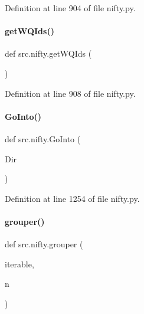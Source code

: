 Definition at line 904 of file nifty.\+py.

\mbox{\label{namespacesrc_1_1nifty_aeafa6a382b79659b374ba813160e4589}} 
\paragraph{\texorpdfstring{get\+W\+Q\+Ids()}{getWQIds()}}
{\footnotesize\ttfamily def src.\+nifty.\+get\+W\+Q\+Ids (\begin{DoxyParamCaption}{ }\end{DoxyParamCaption})}



Definition at line 908 of file nifty.\+py.

\mbox{\label{namespacesrc_1_1nifty_ac5445375fcdc5825bb874014b04c45d7}} 
\paragraph{\texorpdfstring{Go\+Into()}{GoInto()}}
{\footnotesize\ttfamily def src.\+nifty.\+Go\+Into (\begin{DoxyParamCaption}\item[{}]{Dir }\end{DoxyParamCaption})}



Definition at line 1254 of file nifty.\+py.

\mbox{\label{namespacesrc_1_1nifty_aec94a2238f5b946e64468666c9cf9671}} 
\paragraph{\texorpdfstring{grouper()}{grouper()}}
{\footnotesize\ttfamily def src.\+nifty.\+grouper (\begin{DoxyParamCaption}\item[{}]{iterable,  }\item[{}]{n }\end{DoxyParamCaption})}



